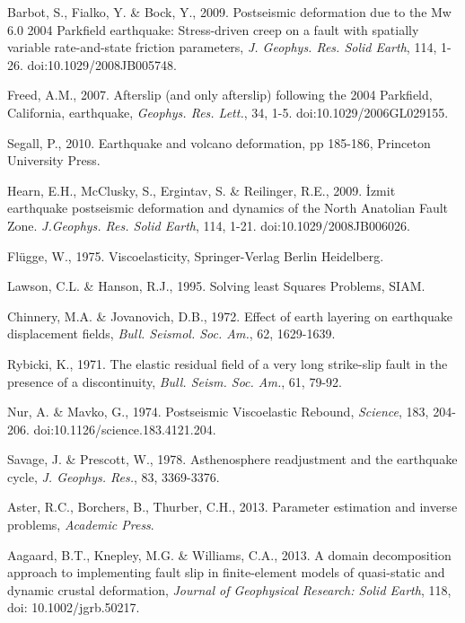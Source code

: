 \documentclass[extra]{gji}
\begin{document}
\begin{thebibliography}{}
 Barbot, S., Fialko, Y. \& Bock,
  Y., 2009. Postseismic deformation due to the Mw 6.0 2004 Parkfield
  earthquake: Stress-driven creep on a fault with spatially variable
  rate-and-state friction parameters, \textit{J. Geophys. Res. Solid
  Earth}, 114, 1-26. doi:10.1029/2008JB005748.

 Freed, A.M., 2007. Afterslip
  (and only afterslip) following the 2004 Parkfield, California,
  earthquake, \textit{Geophys. Res. Lett.}, 34,
  1-5. doi:10.1029/2006GL029155.

 Segall, P., 2010. Earthquake and
  volcano deformation, pp 185-186, Princeton University Press.

 Hearn, E.H., McClusky,
  S., Ergintav, S. \& Reilinger, R.E., 2009. \.Izmit earthquake
  postseismic deformation and dynamics of the North Anatolian Fault
  Zone. \textit{J.Geophys. Res. Solid Earth}, 114,
  1-21. doi:10.1029/2008JB006026.

 Fl\"ugge,
  W., 1975. Viscoelasticity, Springer-Verlag Berlin Heidelberg.

 Lawson, C.L. \&
  Hanson, R.J., 1995. Solving least Squares Problems, SIAM.

 Chinnery,
  M.A. \& Jovanovich, D.B., 1972. Effect of earth layering on
  earthquake displacement fields, \textit{Bull. Seismol.  Soc. Am.},
  62, 1629-1639.

 Rybicki, K., 1971. The elastic
  residual field of a very long strike-slip fault in the presence of a
  discontinuity, \textit{Bull. Seism. Soc. Am.}, 61, 79-92.

 Nur, A. \& Mavko, G.,
  1974. Postseismic Viscoelastic Rebound, \textit{Science}, 183,
  204-206. doi:10.1126/science.183.4121.204.

 Savage, J. \&
  Prescott, W., 1978. Asthenosphere readjustment and the earthquake
  cycle, \textit{J. Geophys. Res.}, 83, 3369-3376.

 Aster, R.C., Borchers,
  B., Thurber, C.H., 2013. Parameter estimation and inverse problems,
  {\textit{Academic Press}}.

 Aagaard, B.T., Knepley,
  M.G. \& Williams, C.A., 2013. A domain decomposition approach to
  implementing fault slip in finite-element models of quasi-static and
  dynamic crustal deformation, \textit{Journal of Geophysical
    Research: Solid Earth}, 118, doi: 10.1002/jgrb.50217.

\end{thebibliography}
\end{document}

